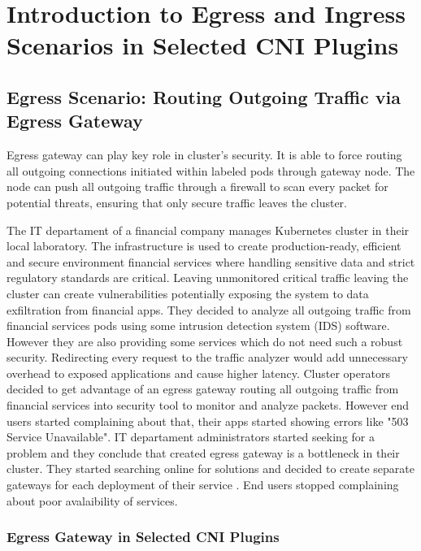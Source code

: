 \chapter{Introduction to Egress and Ingress Scenarios in Selected CNI Plugins}
\label{cha:introScenarios}

\section{Egress Scenario: Routing Outgoing Traffic via Egress Gateway}
\label{sec:egress}

Egress gateway can play key role in cluster's security. It is able to force routing all outgoing connections initiated within labeled pods through gateway node. The node can push all outgoing traffic through a firewall to scan every packet for potential threats, ensuring that only secure traffic leaves the cluster.

The IT departament of a financial company manages Kubernetes cluster in their local laboratory. The infrastructure is used to create production-ready, efficient and secure environment financial services where handling sensitive data and strict regulatory standards are critical. Leaving unmonitored critical traffic leaving the cluster can create vulnerabilities potentially exposing the system to data exfiltration from financial apps. They decided to analyze all outgoing traffic from financial services pods using some intrusion detection system (IDS) software. However they are also providing some services which do not need such a robust security. Redirecting every request to the traffic analyzer would add unnecessary overhead to exposed applications and cause higher latency. Cluster operators decided to get advantage of an egress gateway routing all outgoing traffic from financial services into security tool to monitor and analyze packets. However end users started complaining about that, their apps started showing errors like "503 Service Unavailable". IT departament administrators started seeking for a problem and they conclude that created egress gateway is a bottleneck in their cluster. They started searching online for solutions and decided to create separate gateways for each deployment of their service \cite{CalicoEgressDeploy}. End users stopped complaining about poor avalaibility of services.

\subsection{Egress Gateway in Selected CNI Plugins}
\label{subsection:egressGateway}

